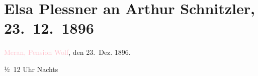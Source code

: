 

\renewcommand{\erwaehntePersonen}{Personen: Grete Litzmann, E. Marlitt, Elsa Plessner}
\renewcommand{\erwaehnteOrte}{Orte: Breslau, Hotel Meranerhof, Meran, Wien}
\renewcommand{\erwaehnteWerke}{Werke: Freiwild. Schauspiel in 3 Akten, Heimweh [dreiaktige Tragikomödie], Odyssee, Orchideen [Schauspiel in drei Akten]}
\section[Elsa Plessner an Arthur Schnitzler, 23. 12. 1896]{Elsa Plessner an Arthur Schnitzler, 23. 12. 1896}
\nopagebreak{}
\rehead{ }\normalsize\beginnumbering{}
\toendnotes[C]{\smallbreak\pagebreak[2]}
\toendnotes[C]{\smallbreak}
\pstart
           {\pb}\textcolor{pink}{Meran, Pension Wolf}{}\ledrightnote{\textcolor{pink}{Hotel Meranerhof}}, den 23. Dez.
                     1896.\pend
           
\pstart
           \raggedleft{}½ 12 Uhr Nachts \pend
           
